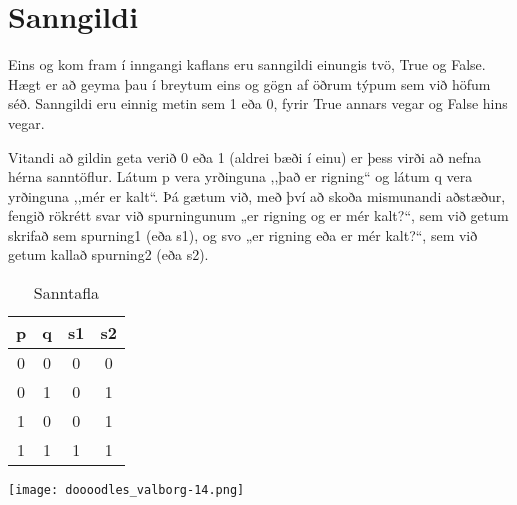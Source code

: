 \section{Sanngildi}

Eins og kom fram í inngangi kaflans eru sanngildi einungis tvö, True og False.
Hægt er að geyma þau í breytum eins og gögn af öðrum týpum sem við höfum séð.
Sanngildi eru einnig metin sem 1 eða 0, fyrir True annars vegar og False hins vegar.

Vitandi að gildin geta verið 0 eða 1 (aldrei bæði í einu) er þess virði að nefna hérna sanntöflur.
Látum p vera yrðinguna ,,það er rigning“ og látum q vera yrðinguna ,,mér er kalt“.
Þá gætum við, með því að skoða mismunandi aðstæður, fengið rökrétt svar við spurningunum „er rigning og er mér kalt?“, sem við getum skrifað sem spurning1 (eða s1), og svo „er rigning eða er mér kalt?“, sem við getum kallað spurning2 (eða s2).

\begin{center}
\begin{table}[h]
	\centering
\caption{Sanntafla}
\vspace{6pt}
\label{tbl:sanntafla}
\begin{tabular}{|c c|c|c|}
	p & q & s1 & s2\\ 
	\hline  
	0 & 0 & 0 & 0\\
	0 & 1 & 0 & 1\\
	1 & 0 & 0 & 1\\
	1 & 1 & 1 & 1\\
	\end{tabular}

\end{table}
\end{center}

\begin{center}
	\texttt{[image: doooodles\_valborg-14.png]}
\end{center}

